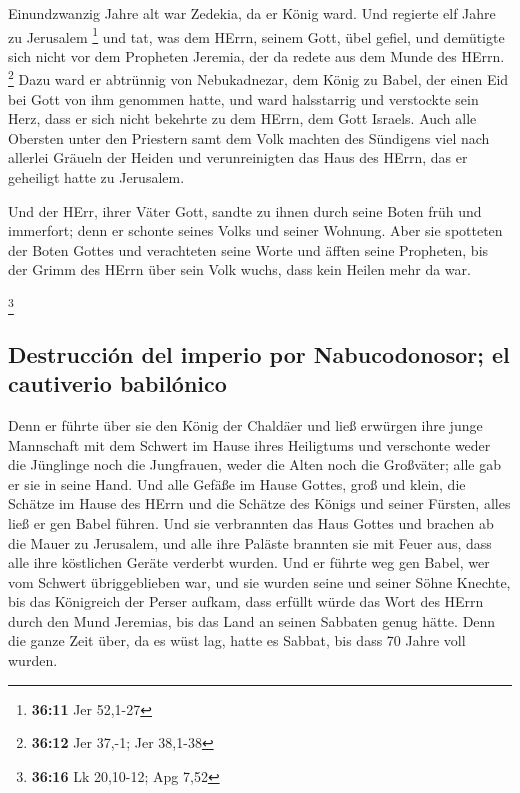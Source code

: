  Einundzwanzig Jahre alt war Zedekia, da er König ward.
Und regierte elf Jahre zu Jerusalem \footnote{\textbf{36:11} Jer 52,1-27}
 und tat, was dem HErrn, seinem Gott, übel gefiel, und
demütigte sich nicht vor dem Propheten Jeremia, der da redete aus dem
Munde des HErrn. \footnote{\textbf{36:12} Jer 37,-1; Jer 38,1-38}
 Dazu ward er abtrünnig von Nebukadnezar, dem König zu
Babel, der einen Eid bei Gott von ihm genommen hatte, und ward
halsstarrig und verstockte sein Herz, dass er sich nicht bekehrte zu dem
HErrn, dem Gott Israels.  Auch alle Obersten unter den
Priestern samt dem Volk machten des Sündigens viel nach allerlei Gräueln
der Heiden und verunreinigten das Haus des HErrn, das er geheiligt hatte
zu Jerusalem.

 Und der HErr, ihrer Väter Gott, sandte zu ihnen durch
seine Boten früh und immerfort; denn er schonte seines Volks und seiner
Wohnung.  Aber sie spotteten der Boten Gottes und
verachteten seine Worte und äfften seine Propheten, bis der Grimm des
HErrn über sein Volk wuchs, dass kein Heilen mehr da war.

\footnote{\textbf{36:16} Lk 20,10-12; Apg 7,52}

\hypertarget{destrucciuxf3n-del-imperio-por-nabucodonosor-el-cautiverio-babiluxf3nico}{%
\subsection{Destrucción del imperio por Nabucodonosor; el cautiverio
babilónico}\label{destrucciuxf3n-del-imperio-por-nabucodonosor-el-cautiverio-babiluxf3nico}}

 Denn er führte über sie den König der Chaldäer und ließ
erwürgen ihre junge Mannschaft mit dem Schwert im Hause ihres Heiligtums
und verschonte weder die Jünglinge noch die Jungfrauen, weder die Alten
noch die Großväter; alle gab er sie in seine Hand.  Und
alle Gefäße im Hause Gottes, groß und klein, die Schätze im Hause des
HErrn und die Schätze des Königs und seiner Fürsten, alles ließ er gen
Babel führen.  Und sie verbrannten das Haus Gottes und
brachen ab die Mauer zu Jerusalem, und alle ihre Paläste brannten sie
mit Feuer aus, dass alle ihre köstlichen Geräte verderbt wurden.
 Und er führte weg gen Babel, wer vom Schwert
übriggeblieben war, und sie wurden seine und seiner Söhne Knechte, bis
das Königreich der Perser aufkam,  dass erfüllt würde das
Wort des HErrn durch den Mund Jeremias, bis das Land an seinen Sabbaten
genug hätte. Denn die ganze Zeit über, da es wüst lag, hatte es Sabbat,
bis dass 70 Jahre voll wurden.

